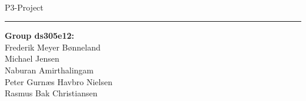 \newcommand{\HRule}[1]{\hfill \rule{0.2\linewidth}{#1}}

\thispagestyle{empty}
\vspace*{1.5cm}

\noindent \colorbox{Sapphire}{
\parbox[t]{1.0\linewidth}{
\centering \fontsize{45pt}{80pt}\selectfont
\vspace*{1.0cm}
        \textcolor{White}{
\vspace*{0.7cm}
        }
}
}
\\[2em]
\huge P3-Project

\vfill
\flushright
\flushright \rule[20pt]{0.1pt}{9em} \begin{minipage}[b]{0.50\linewidth}
{
\Large
\textbf{Group ds305e12:} \\
Frederik Meyer Bønneland\\
Michael Jensen\\
Naburan Amirthalingam\\
Peter Gurnæs Havbro Nielsen\\
Rasmus Bak Christiansen\\
}
\end{minipage}
\clearpage 
